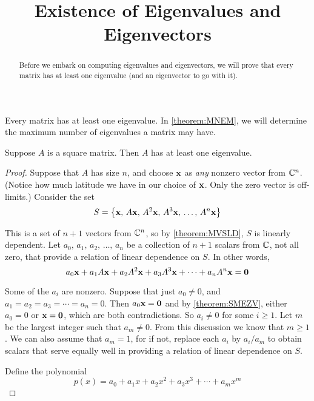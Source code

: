 \documentclass{ximera}
\title{Existence of Eigenvalues and Eigenvectors}
\begin{document}
\begin{abstract}
  Before we embark on computing eigenvalues and eigenvectors, we will prove that every matrix has at least one eigenvalue (and an eigenvector to go with it).
\end{abstract}
\maketitle

Every matrix has at least one eigenvalue.  In \ref{theorem:MNEM}, we
will determine the maximum number of eigenvalues a matrix may have.

\begin{theorem}
\label{theorem:EMHE}

Suppose $A$ is a square matrix.  Then $A$ has at least one eigenvalue.


\begin{proof}
Suppose that $A$ has size $n$, and choose $\mathbf{x}$ as \textit{any} nonzero vector from $\mathbb{C}^{n}$.  (Notice how much latitude we have in our choice of $\mathbf{x}$.  Only the zero vector is off-limits.)  Consider the set
\[
S=\left\{\mathbf{x},\,A\mathbf{x},\,A^2\mathbf{x},\,A^3\mathbf{x},\,\ldots,\,A^n\mathbf{x}\right\}
\]




This is a set of $n+1$ vectors from $\mathbb{C}^{n}$, so by \ref{theorem:MVSLD}, $S$ is linearly dependent.  Let $a_0,\,a_1,\,a_2,\,\ldots,\,a_n$ be a collection of $n+1$ scalars from $\mathbb{C}$, not all zero, that provide a relation of linear dependence on $S$.  In other words,
\[
a_0\mathbf{x}+a_1A\mathbf{x}+a_2A^2\mathbf{x}+a_3A^3\mathbf{x}+\cdots+a_nA^n\mathbf{x}=\mathbf{0}
\]




Some of the $a_i$ are nonzero.  Suppose that just $a_0\neq 0$, and $a_1=a_2=a_3=\cdots=a_n=0$.  Then $a_0\mathbf{x}=\mathbf{0}$ and by \ref{theorem:SMEZV}, either $a_0=0$ or $\mathbf{x}=\mathbf{0}$, which are both contradictions.  So $a_i\neq 0$ for some $i\geq 1$.  Let $m$ be the largest integer such that $a_m\neq 0$.  From this discussion we know that $m\geq 1$.  We can also assume that $a_m=1$, for if not, replace each $a_i$ by $a_i/a_m$ to obtain scalars that serve equally well in providing a relation of linear dependence on $S$.



Define the polynomial
\[
p(x)=a_0+a_1x+a_2x^2+a_3x^3+\cdots+a_mx^m
\]





\end{proof}
\end{theorem}
\end{document}
